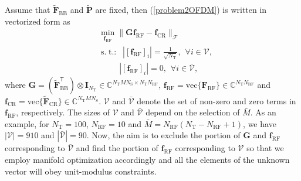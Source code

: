 \documentclass[journal,10pt]{IEEEtran}
\DeclareMathOperator*{\subjectto}{s.\hspace{3pt} t.:\hspace{3pt}} %
\begin{document}
	{\color{black}Assume that $\widetilde{\mathbf{F}}_\mathrm{BB}$ and $\widetilde{\mathbf{P}}$ are fixed, then  (\ref{problem2OFDM}) is written in vectorized form as
		\begin{align}
		\label{frf}
		&\min_{\mathbf{f}_\mathrm{RF}}  \|\mathbf{G}\mathbf{f}_\mathrm{RF} -\mathbf{f}_\mathrm{CR} \|_\mathcal{F}  \nonumber \\
		&\subjectto \hspace{3pt} |[\mathbf{f}_\mathrm{RF}]_{i}| = \frac{1}{\sqrt{N_\mathrm{T}}}, \hspace{5pt} \forall i \in \mathcal{V}, \nonumber \\
		&\hspace{30pt} |[\mathbf{f}_\mathrm{RF}]_{i}| = 0, \hspace{5pt} \forall i\in \bar{\mathcal{V}}, 
		\end{align}
		where $\mathbf{G} = (\widetilde{\mathbf{F}}_\mathrm{BB}^\textsf{T})\otimes \mathbf{I}_{N_\mathrm{T}} \in \mathbb{C}^{N_\mathrm{T}MN_\mathrm{S}\times N_\mathrm{T}N_\mathrm{RF}}$,  $\mathbf{f}_\mathrm{RF} = \mathrm{vec}\{\mathbf{F}_\mathrm{RF}\}\in \mathbb{C}^{N_\mathrm{T}N_\mathrm{RF}}$  and $\mathbf{f}_\mathrm{CR} = \mathrm{vec}\{\widetilde{\mathbf{F}}_\mathrm{CR}\}\in \mathbb{C}^{N_\mathrm{T}MN_\mathrm{S}}$. $\mathcal{V}$ and $\bar{\mathcal{V}}$ denote the set of non-zero and zero terms in $\mathbf{f}_\mathrm{RF}$, respectively. The sizes of $\mathcal{V}$ and $\bar{\mathcal{V}}$ depend on the selection of $\bar{M}$. As an example, for $N_\mathrm{T} = 100$, $N_\mathrm{RF} = 10$ and  $\bar{M} = N_\mathrm{RF}(N_\mathrm{T} - N_\mathrm{RF}+1)$, we have  $|\mathcal{V}| = 910$ and $|\bar{\mathcal{V}}| = 90$. Now, the aim is to exclude the portion of $\mathbf{G}$ and $\mathbf{f}_\mathrm{RF}$ corresponding to $\bar{\mathcal{V}}$ and find the portion of $\mathbf{f}_\mathrm{RF}$ corresponding to ${\mathcal{V}}$ so that we employ manifold optimization accordingly and all the elements of the unknown vector will obey unit-modulus constraints. }
	
\end{document}
